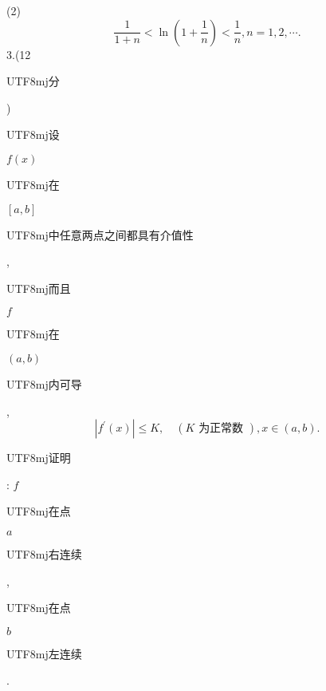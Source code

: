\documentclass[10pt]{article}
\begin{document}
(2)
$$
\frac{1}{1+n}<\ln \left(1+\frac{1}{n}\right)<\frac{1}{n}, n=1,2, \cdots .
$$
3.(12 \begin{CJK}{UTF8}{mj}分\end{CJK}) \begin{CJK}{UTF8}{mj}设\end{CJK} $f(x)$ \begin{CJK}{UTF8}{mj}在\end{CJK} $[a, b]$ \begin{CJK}{UTF8}{mj}中任意两点之间都具有介值性\end{CJK},\begin{CJK}{UTF8}{mj}而且\end{CJK} $f$ \begin{CJK}{UTF8}{mj}在\end{CJK} $(a, b)$ \begin{CJK}{UTF8}{mj}内可导\end{CJK},
$$
\left|f^{\prime}(x)\right| \leqslant K, \quad(K \text { 为正常数 }), x \in(a, b) .
$$
\begin{CJK}{UTF8}{mj}证明\end{CJK}: $f$ \begin{CJK}{UTF8}{mj}在点\end{CJK} $a$ \begin{CJK}{UTF8}{mj}右连续\end{CJK}, \begin{CJK}{UTF8}{mj}在点\end{CJK} $b$ \begin{CJK}{UTF8}{mj}左连续\end{CJK}.
\end{document}
